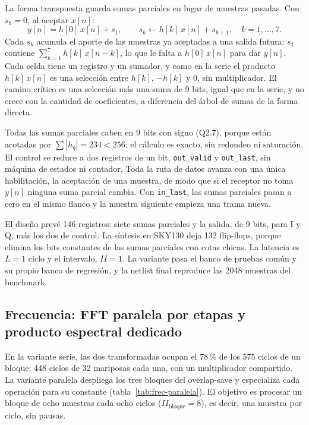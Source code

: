 La forma transpuesta guarda sumas parciales en lugar de muestras pasadas. Con $s_8 = 0$, al aceptar $x[n]$:
\begin{equation}
  y[n] = h[0]\,x[n] + s_1, \qquad s_k \leftarrow h[k]\,x[n] + s_{k+1}, \quad k = 1, \dots, 7.
\end{equation}
Cada $s_k$ acumula el aporte de las muestras ya aceptadas a una salida futura: $s_1$ contiene $\sum_{k=1}^{7} h[k]\,x[n-k]$, lo que le falta a $h[0]\,x[n]$ para dar $y[n]$. Cada celda tiene un registro y un sumador, y como en la serie el producto $h[k]\,x[n]$ es una selección entre $h[k]$, $-h[k]$ y 0, sin multiplicador. El camino crítico es una selección más una suma de 9 bits, igual que en la serie, y no crece con la cantidad de coeficientes, a diferencia del árbol de sumas de la forma directa.

Todas las sumas parciales caben en 9 bits con signo (Q2.7), porque están acotadas por $\sum |h_q| = 234 < 256$; el cálculo es exacto, sin redondeo ni saturación. El control se reduce a dos registros de un bit, \texttt{out\_valid} y \texttt{out\_last}, sin máquina de estados ni contador. Toda la ruta de datos avanza con una única habilitación, la aceptación de una muestra, de modo que si el receptor no toma $y[n]$ ninguna suma parcial cambia. Con \texttt{in\_last}, las sumas parciales pasan a cero en el mismo flanco y la muestra siguiente empieza una trama nueva.

El diseño prevé 146 registros: siete sumas parciales y la salida, de 9 bits, para I y Q, más los dos de control. La síntesis en SKY130 deja 132 flip-flops, porque elimina los bits constantes de las sumas parciales con cotas chicas. La latencia es $L = 1$ ciclo y el intervalo, $II = 1$. La variante pasa el banco de pruebas común y su propio banco de regresión, y la netlist final reproduce las 2048 muestras del benchmark.

\subsection{Frecuencia: FFT paralela por etapas y producto espectral dedicado}

En la variante serie, las dos transformadas ocupan el 78\,\% de los 575 ciclos de un bloque: 448 ciclos de 32 mariposas cada una, con un multiplicador compartido. La variante paralela despliega los tres bloques del overlap-save y especializa cada operación para su constante (tabla~\ref{tab:frec-paralela}). El objetivo es procesar un bloque de ocho muestras cada ocho ciclos ($II_\text{bloque} = 8$), es decir, una muestra por ciclo, sin pausas.


